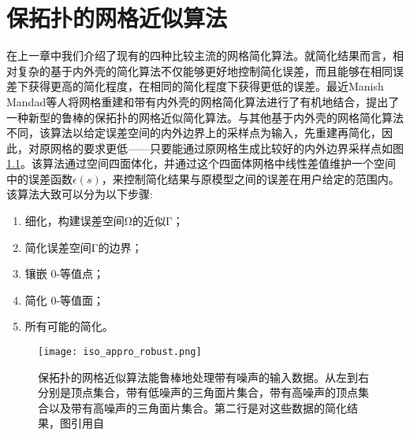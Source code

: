 
\chapter{保拓扑的网格近似算法}
在上一章中我们介绍了现有的四种比较主流的网格简化算法。就简化结果而言，相对复杂的基于内外壳的简化算法不仅能够更好地控制简化误差，而且能够在相同误差下获得更高的简化程度，在相同的简化程度下获得更低的误差。最近Manish Mandad等人将网格重建和带有内外壳的网格简化算法进行了有机地结合，提出了一种新型的鲁棒的保拓扑的网格近似简化算法\cite{isotopic-appro}。与其他基于内外壳的网格简化算法不同，该算法以给定误差空间的内外边界上的采样点为输入，先重建再简化，因此，对原网格的要求更低——只要能通过原网格生成比较好的内外边界采样点如图\ref{fig:iso-appro-robust}。该算法通过空间四面体化，并通过这个四面体网格中线性差值维护一个空间中的误差函数$\epsilon(s)$，来控制简化结果与原模型之间的误差在用户给定的范围内。该算法大致可以分为以下步骤:
\begin{enumerate}[（1）]
  \item 细化，构建误差空间Ω的近似Γ；
  \item 简化误差空间Γ的边界；
  \item 镶嵌 0-等值点；
  \item 简化 0-等值面；
  \item 所有可能的简化。
\end{enumerate}
\begin{figure}[htbp]
    \centering
    \texttt{[image: iso\_appro\_robust.png]}
    \caption[保拓扑的网格近似算法的鲁棒性]{保拓扑的网格近似算法能鲁棒地处理带有噪声的输入数据。从左到右分别是顶点集合，带有低噪声的三角面片集合，带有高噪声的顶点集合以及带有高噪声的三角面片集合。第二行是对这些数据的简化结果，图引用自\cite{isotopic-appro}}
    \label{fig:iso-appro-robust}
\end{figure}


